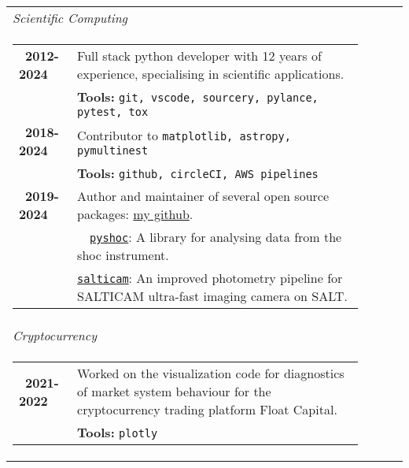 \documentclass{article}
\newcommand{\tb}{\textbullet}
\newcommand{\skill}[2]{%
  \hspace{10pt}\tb\hspace{10pt} \emph{#1} & #2          \\
  }
\newcommand{\shoc}{\gls*{shoc}\xspace}
\begin{document}
\begin{tabular}{l p{}}
  
  \emph{\large Scientific Computing}
  \\
  \multicolumn{2}{c}{\parbox{0.95\textwidth}{
    \begin{tabular}{p{0.15\linewidth}p{0.75\linewidth}}
      \tb \ {\bf 2012-2024}
      & Full stack python developer with 12 years of experience, specialising in
        scientific applications.   \\
      & {\bf Tools:} {\tt git, vscode, sourcery, pylance, pytest, tox} \\

      \tb \ {\bf 2018-2024}
        & Contributor to {\tt matplotlib, astropy, pymultinest} \\
        & {\bf Tools:} {\tt github, circleCI, AWS pipelines} \\

      \tb \ {\bf 2019-2024}
        & Author and maintainer of several open source packages:
          \href{https://github.com/astromancer}{my github}. \\
        & \ \ \href{https://github.com/astromancer/pyshoc}{\tt pyshoc}:
            A library for analysing data from the \shoc instrument.  \\
        & \href{https://github.com/astromancer/salticam}{\tt salticam}:
          An improved photometry pipeline for SALTICAM ultra-fast imaging camera
          on SALT. \\
      \end{tabular}
  }}
  \\

  \emph{\large Cryptocurrency}
  \\
  \multicolumn{2}{c}{\parbox{0.95\textwidth}{
    \begin{tabular}{p{0.15\linewidth}p{0.75\linewidth}}
      \tb \ {\bf 2021-2022}
      & Worked on the visualization code for diagnostics of market system 
      behaviour for the cryptocurrency trading platform Float Capital. \\
      & {\bf Tools:} {\tt plotly} \\


      \end{tabular}
  }}
  \\
  
\end{tabular}
\end{document}
